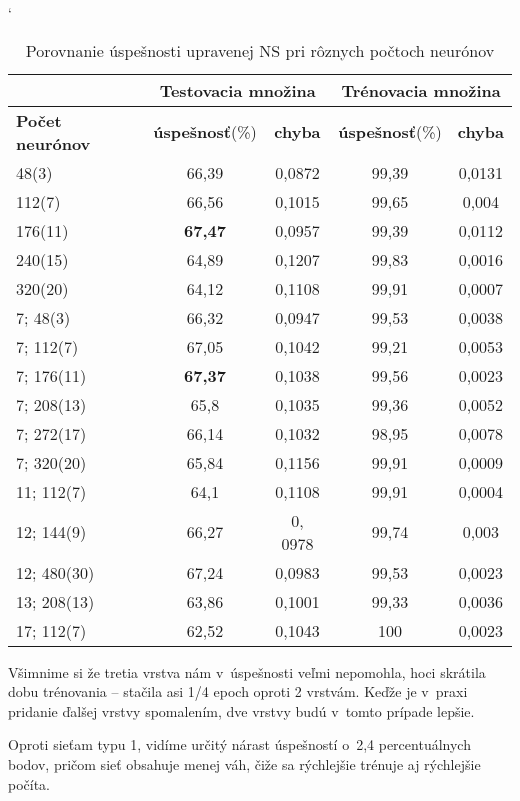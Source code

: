 \begin{table}[htp]
\catcode` %
\centering
\begin{tabular}{|l|c|c|c|c|}
\cline{2-5}
\multicolumn{1}{l}{} & \multicolumn{2}{|c|}{\textbf{Testovacia množina}} & \multicolumn{2}{c|}{\textbf{Trénovacia množina}}\\ 
\hline
\textbf{Počet neurónov} & \textbf{úspešnosť}(\%) & \textbf{chyba} & \textbf{úspešnosť}(\%) & \textbf{chyba} \\ \hline
48(3)& 66,39 & 0,0872 & 99,39 & 0,0131 \\ \hline
112(7)& 66,56 & 0,1015 & 99,65 & 0,004 \\ \hline 
176(11)& \textbf{67,47} & 0,0957 & 99,39 & 0,0112 \\ \hline
240(15)& 64,89 & 0,1207 & 99,83 & 0,0016 \\ \hline
320(20)& 64,12 & 0,1108 & 99,91 & 0,0007 \\ \hline
7; 48(3)& 66,32 & 0,0947 & 99,53 & 0,0038 \\ \hline 
7; 112(7)& 67,05 & 0,1042 & 99,21 & 0,0053 \\ \hline 
7; 176(11)& \textbf{67,37} & 0,1038 & 99,56 & 0,0023 \\ \hline
7; 208(13)& 65,8  & 0,1035 & 99,36 & 0,0052 \\ \hline 
7; 272(17)& 66,14 & 0,1032 & 98,95 & 0,0078 \\ \hline 
7; 320(20)& 65,84& 0,1156 & 99,91 & 0,0009\\ \hline 
11; 112(7)& 64,1 & 0,1108 & 99,91 & 0,0004 \\ \hline
12; 144(9)& 66,27 & 0, 0978 & 99,74 & 0,003 \\ \hline
12; 480(30)& 67,24 & 0,0983 & 99,53 & 0,0023 \\ \hline 
13; 208(13)& 63,86 & 0,1001 & 99,33 & 0,0036 \\ \hline 
17; 112(7)& 62,52 & 0,1043 & 100 & 0,0023 \\ \hline
\end{tabular}
\caption{Porovnanie úspešnosti upravenej NS pri rôznych počtoch neurónov}
\label{tab:neuroncountcmp2}
\end{table}

Všimnime si že tretia vrstva nám v~úspešnosti veľmi nepomohla, hoci skrátila dobu trénovania -- stačila asi 1/4 epoch oproti 2 vrstvám. Keďže je v~praxi pridanie ďalšej vrstvy spomalením, dve vrstvy budú v~tomto prípade lepšie.

Oproti sieťam typu 1, vidíme určitý nárast úspešností o~2,4 percentuálnych bodov, pričom sieť obsahuje menej váh, čiže sa rýchlejšie trénuje aj rýchlejšie počíta.

